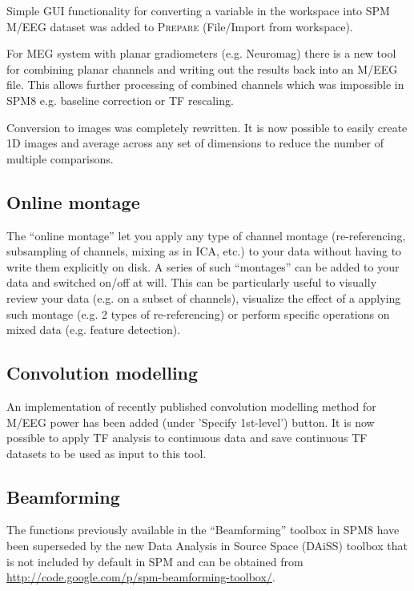 \documentclass[a4paper,titlepage,openany]{article}
\begin{document}
Simple GUI functionality for converting a variable in the workspace into SPM M/EEG dataset was added to \textsc{Prepare} (File/Import from workspace).

For MEG system with planar gradiometers (e.g. Neuromag) there is a new tool for combining planar channels and writing out the results back into an M/EEG file. This allows further processing of combined channels which was impossible in SPM8 e.g. baseline correction or TF rescaling.

Conversion to images was completely rewritten. It is now possible to easily create 1D images and average across any set of dimensions to reduce the number of multiple comparisons.

\subsection{Online montage}

The ``online montage'' let you apply any type of channel montage (re-referencing, subsampling of channels, mixing as in ICA, etc.) to your data without having to write them explicitly on disk. A series of such ``montages'' can be added to your data and switched on/off at will. This can be particularly useful to visually review your data (e.g. on a subset of channels), visualize the effect of a applying such montage (e.g. 2 types of re-referencing) or perform specific operations on mixed data (e.g. feature detection).

\subsection{Convolution modelling}

An implementation of recently published convolution modelling method for M/EEG power \cite{Litvak_ConvModel_2013} has been added (under 'Specify 1st-level') button. It is now possible to apply TF analysis to continuous data and save continuous TF datasets to be used as input to this tool.

\subsection{Beamforming}

The functions previously available in the ``Beamforming'' toolbox in SPM8 have been superseded by the new Data Analysis in Source Space (DAiSS) toolbox that is not included by default in SPM and can be obtained from \url{http://code.google.com/p/spm-beamforming-toolbox/}.
\end{document}
